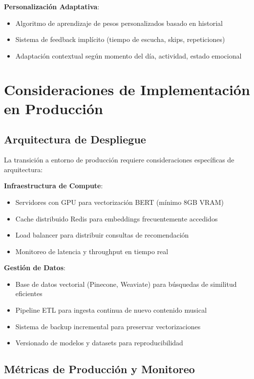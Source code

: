 \documentclass[12pt,a4paper]{report}
\begin{document}
\textbf{Personalización Adaptativa}:
\begin{itemize}
\item Algoritmo de aprendizaje de pesos personalizados basado en historial
\item Sistema de feedback implícito (tiempo de escucha, skips, repeticiones)
\item Adaptación contextual según momento del día, actividad, estado emocional
\end{itemize}

\section{Consideraciones de Implementación en Producción}

\subsection{Arquitectura de Despliegue}

La transición a entorno de producción requiere consideraciones específicas de arquitectura:

\textbf{Infraestructura de Compute}:
\begin{itemize}
\item Servidores con GPU para vectorización BERT (mínimo 8GB VRAM)
\item Cache distribuido Redis para embeddings frecuentemente accedidos
\item Load balancer para distribuir consultas de recomendación
\item Monitoreo de latencia y throughput en tiempo real
\end{itemize}

\textbf{Gestión de Datos}:
\begin{itemize}
\item Base de datos vectorial (Pinecone, Weaviate) para búsquedas de similitud eficientes
\item Pipeline ETL para ingesta continua de nuevo contenido musical
\item Sistema de backup incremental para preservar vectorizaciones
\item Versionado de modelos y datasets para reproducibilidad
\end{itemize}

\subsection{Métricas de Producción y Monitoreo}
\end{document}
